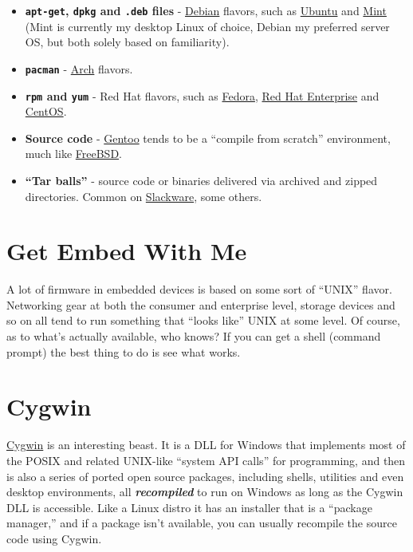 \documentclass[10pt,]{book}
\numberwithin{figure}{chapter}
\begin{document}
\begin{itemize}
\item
  \textbf{\texttt{apt-get}, \texttt{dpkg} and \texttt{.deb} files} -
   
  \href{https://en.wikipedia.org/wiki/Debian}{Debian} flavors, such as
  \href{https://en.wikipedia.org/wiki/Ubuntu_\%28operating_system\%29}{Ubuntu}
  and \href{https://en.wikipedia.org/wiki/Linux_Mint}{Mint} (Mint is
  currently my desktop Linux of choice, Debian my preferred server OS,
  but both solely based on familiarity).
\item
  \textbf{\texttt{pacman}} - 
  \href{https://en.wikipedia.org/wiki/Arch_Linux}{Arch} flavors.
\item
  \textbf{\texttt{rpm} and \texttt{yum}} -   Red
  Hat flavors, such as
  \href{https://en.wikipedia.org/wiki/Fedora_\%28operating_system\%29}{Fedora},
  \href{https://en.wikipedia.org/wiki/Red_Hat_Enterprise_Linux}{Red Hat
  Enterprise} and \href{https://en.wikipedia.org/wiki/CentOS}{CentOS}.
\item
  \textbf{Source code} -
  \href{https://en.wikipedia.org/wiki/Gentoo_Linux}{Gentoo} tends to be
  a ``compile from scratch'' environment, much like
  \href{https://en.wikipedia.org/wiki/FreeBSD_Ports}{FreeBSD}.
\item
  \textbf{``Tar balls''} - source code or binaries delivered via
  archived and zipped directories. Common on
  \href{https://en.wikipedia.org/wiki/Slackware}{Slackware}, some
  others.
\end{itemize}

\section{Get Embed With Me}\label{get-embed-with-me}

A lot of firmware in embedded devices is based on some sort of ``UNIX''
flavor. Networking gear at both the consumer and enterprise level,
storage devices and so on all tend to run something that ``looks like''
UNIX at some level. Of course, as to what's actually available, who
knows? If you can get a shell (command prompt) the best thing to do is
see what works.

\section{Cygwin}\label{cygwin}

\href{http://cygwin.com/}{Cygwin}  is an interesting
beast. It is a DLL for Windows that implements most of the POSIX and
related UNIX-like ``system API calls'' for programming, and then is also
a series of ported open source packages, including shells, utilities and
even desktop environments, all \textbf{\emph{recompiled}} to run on
Windows as long as the Cygwin DLL is accessible. Like a Linux distro it
has an installer that is a ``package manager,'' and if a package isn't
available, you can usually recompile the source code using Cygwin.
\end{document}
